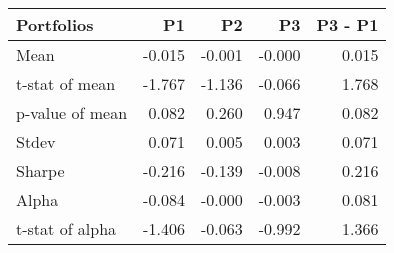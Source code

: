 \begin{tabular}{lrrrr}
\toprule
Portfolios & P1 & P2 & P3 & P3 - P1 \\
\midrule
Mean & -0.015 & -0.001 & -0.000 & 0.015 \\
t-stat of mean & -1.767 & -1.136 & -0.066 & 1.768 \\
p-value of mean & 0.082 & 0.260 & 0.947 & 0.082 \\
Stdev & 0.071 & 0.005 & 0.003 & 0.071 \\
Sharpe & -0.216 & -0.139 & -0.008 & 0.216 \\
Alpha & -0.084 & -0.000 & -0.003 & 0.081 \\
t-stat of alpha & -1.406 & -0.063 & -0.992 & 1.366 \\
\bottomrule
\end{tabular}
